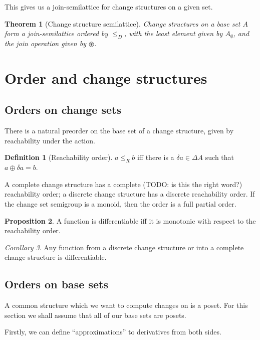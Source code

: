 \documentclass[english]{article}
\theoremstyle{plain}
\newtheorem{thm}{Theorem}
\theoremstyle{definition}
\newtheorem{prop}[thm]{Proposition}
\theoremstyle{remark}
\theoremstyle{remark}
\newtheorem{corollary}[thm]{Corollary}
\theoremstyle{remark}
\theoremstyle{definition}
\newtheorem{defn}{Definition}
\newcommand{\cplus}{\oplus}
\newcommand{\changes}[1]{\Delta #1}
\newcommand{\change}[1]{\delta #1}
\newcommand{\discrete}{\emptyset}
\newcommand{\superpose}{\circledast}
\newcommand{\reachOrder}{\leq_R}
\newcommand{\fineOrder}{\leq_D}
\begin{document}
This gives us a join-semilattice for change structures on a given set.

\begin{thm}[Change structure semilattice]
  Change structures on a base set $A$ form a join-semilattice 
  ordered by $\fineOrder$, with the least element given by
  $A_\discrete$, and the join operation given by $\superpose$.
\end{thm}

\section{Order and change structures}

\subsection{Orders on change sets}

There is a natural preorder on the base set of a change structure, given by reachability under the action.

\begin{defn}[Reachability order]
  $a \reachOrder b$ iff there is a $\change{a} \in \changes{A}$ such that $a \cplus
  \change{a} = b$.
\end{defn}

A complete change structure has a complete (TODO: is this the right word?) reachability order;
a discrete change structure has a discrete reachability order. If the change set
semigroup is a monoid, then the order is a full partial order.

\begin{prop}
  A function is differentiable iff it is monotonic with respect to the
  reachability order.
\end{prop}

\begin{corollary}
  Any function from a discrete change structure or into a complete change
  structure is differentiable.
\end{corollary}

\subsection{Orders on base sets}

A common structure which we want to compute changes on is a poset. For this
section we shall assume that all of our base sets are posets.

Firstly, we can define ``approximations'' to derivatives from both sides.
\end{document}
